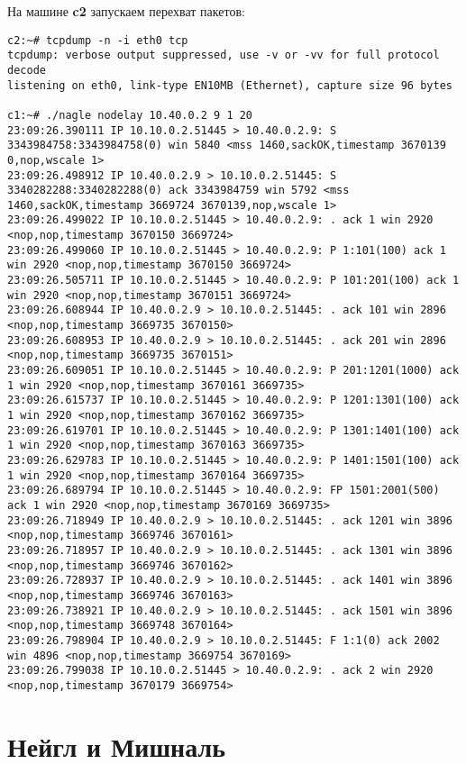 \documentclass[a4paper,12pt]{article}
\begin{document}
На машине \textbf{c2} запускаем перехват пакетов:
\begin{lstlisting}
c2:~# tcpdump -n -i eth0 tcp
tcpdump: verbose output suppressed, use -v or -vv for full protocol decode
listening on eth0, link-type EN10MB (Ethernet), capture size 96 bytes

c1:~# ./nagle nodelay 10.40.0.2 9 1 20
23:09:26.390111 IP 10.10.0.2.51445 > 10.40.0.2.9: S 3343984758:3343984758(0) win 5840 <mss 1460,sackOK,timestamp 3670139 0,nop,wscale 1>
23:09:26.498912 IP 10.40.0.2.9 > 10.10.0.2.51445: S 3340282288:3340282288(0) ack 3343984759 win 5792 <mss 1460,sackOK,timestamp 3669724 3670139,nop,wscale 1>
23:09:26.499022 IP 10.10.0.2.51445 > 10.40.0.2.9: . ack 1 win 2920 <nop,nop,timestamp 3670150 3669724>
23:09:26.499060 IP 10.10.0.2.51445 > 10.40.0.2.9: P 1:101(100) ack 1 win 2920 <nop,nop,timestamp 3670150 3669724>
23:09:26.505711 IP 10.10.0.2.51445 > 10.40.0.2.9: P 101:201(100) ack 1 win 2920 <nop,nop,timestamp 3670151 3669724>
23:09:26.608944 IP 10.40.0.2.9 > 10.10.0.2.51445: . ack 101 win 2896 <nop,nop,timestamp 3669735 3670150>
23:09:26.608953 IP 10.40.0.2.9 > 10.10.0.2.51445: . ack 201 win 2896 <nop,nop,timestamp 3669735 3670151>
23:09:26.609051 IP 10.10.0.2.51445 > 10.40.0.2.9: P 201:1201(1000) ack 1 win 2920 <nop,nop,timestamp 3670161 3669735>
23:09:26.615737 IP 10.10.0.2.51445 > 10.40.0.2.9: P 1201:1301(100) ack 1 win 2920 <nop,nop,timestamp 3670162 3669735>
23:09:26.619701 IP 10.10.0.2.51445 > 10.40.0.2.9: P 1301:1401(100) ack 1 win 2920 <nop,nop,timestamp 3670163 3669735>
23:09:26.629783 IP 10.10.0.2.51445 > 10.40.0.2.9: P 1401:1501(100) ack 1 win 2920 <nop,nop,timestamp 3670164 3669735>
23:09:26.689794 IP 10.10.0.2.51445 > 10.40.0.2.9: FP 1501:2001(500) ack 1 win 2920 <nop,nop,timestamp 3670169 3669735>
23:09:26.718949 IP 10.40.0.2.9 > 10.10.0.2.51445: . ack 1201 win 3896 <nop,nop,timestamp 3669746 3670161>
23:09:26.718957 IP 10.40.0.2.9 > 10.10.0.2.51445: . ack 1301 win 3896 <nop,nop,timestamp 3669746 3670162>
23:09:26.728937 IP 10.40.0.2.9 > 10.10.0.2.51445: . ack 1401 win 3896 <nop,nop,timestamp 3669746 3670163>
23:09:26.738921 IP 10.40.0.2.9 > 10.10.0.2.51445: . ack 1501 win 3896 <nop,nop,timestamp 3669748 3670164>
23:09:26.798904 IP 10.40.0.2.9 > 10.10.0.2.51445: F 1:1(0) ack 2002 win 4896 <nop,nop,timestamp 3669754 3670169>
23:09:26.799038 IP 10.10.0.2.51445 > 10.40.0.2.9: . ack 2 win 2920 <nop,nop,timestamp 3670179 3669754>
\end{lstlisting}

\section{Нейгл и Мишналь}
\end{document}
